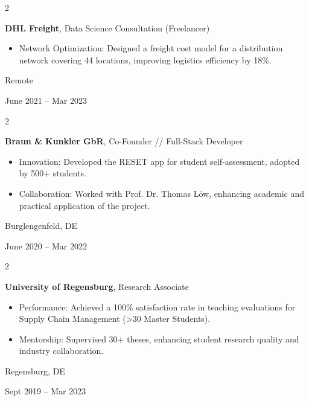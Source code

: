 \documentclass[10pt, a4paper]{article}
\newenvironment{highlights}{
    \begin{itemize}[
        topsep=0.10 cm,
        parsep=0.10 cm,
        partopsep=0pt,
        itemsep=0pt,
        leftmargin=0.4 cm + 10pt
    ]
}{
    \end{itemize}
} %
\newenvironment{twocolentry}[2][]{
    \onecolentry
    \def\secondColumn{#2}
    \setcolumnwidth{\fill, 4.5 cm}
    \begin{paracol}{2}
}{
    \switchcolumn \raggedleft \secondColumn
    \end{paracol}
    \endonecolentry
} %
\begin{document}
        \begin{twocolentry}{
            Remote

        June 2021 – Mar 2023
        }
            \textbf{DHL Freight}, Data Science Consultation (Freelancer)
            \begin{highlights}
                \item Network Optimization: Designed a freight cost model for a distribution network covering 44 locations, improving logistics efficiency by 18\%.
            \end{highlights}
        \end{twocolentry}


        \vspace{0.2 cm}

        \begin{twocolentry}{
            Burglengenfeld, DE

        June 2020 – Mar 2022
        }
            \textbf{Braun \& Kunkler GbR}, Co-Founder // Full-Stack Developer
            \begin{highlights}
                \item Innovation: Developed the RESET app for student self-assessment, adopted by 500+ students.
                \item Collaboration: Worked with Prof. Dr. Thomas Löw, enhancing academic and practical application of the project.
            \end{highlights}
        \end{twocolentry}


        \vspace{0.2 cm}

        \begin{twocolentry}{
            Regensburg, DE

        Sept 2019 – Mar 2023
        }
            \textbf{University of Regensburg}, Research Associate
            \begin{highlights}
                \item Performance: Achieved a 100\% satisfaction rate in teaching evaluations for Supply Chain Management (>30 Master Students).
                \item Mentorship: Supervised 30+ theses, enhancing student research quality and industry collaboration.
            \end{highlights}
        \end{twocolentry}


        \vspace{0.2 cm}
\end{document}
